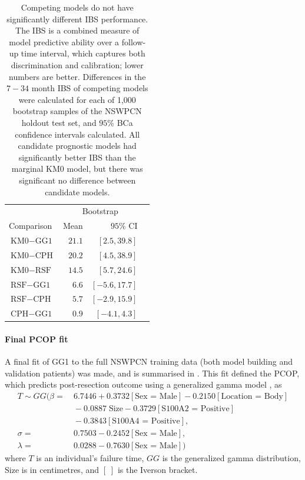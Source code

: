 \documentclass[dissertation.tex]{subfiles}
\begin{document}
\begin{table}
\centering
\caption[Prognostic model \acrshort{IBS} comparison]{Competing models do not have significantly different \gls{IBS} performance.  The \gls{IBS} is a combined measure of model predictive ability over a follow-up time interval, which captures both discrimination and calibration; lower numbers are better.  Differences in the $7-34$ month \gls{IBS} of competing models were calculated for each of 1,000 bootstrap samples of the \gls{NSWPCN} holdout test set, and $95\%$ BCa confidence intervals \cite{Efron1987} calculated.  All candidate prognostic models had significantly better \gls{IBS} than the marginal KM0 model, but there was significant no difference between candidate models.}
\label{tab:nomo-ibs-boot}
\begin{tabular}{lrrr}
\toprule
                             & \multicolumn{2}{c}{Bootstrap}   \\ \cmidrule(r){2-3}
Comparison                   & Mean          & $95\%$ CI       \\ \midrule
$\mbox{KM0} - \mbox{GG1}$    & $21.1$        & $[2.5, 39.8]$   \\
$\mbox{KM0} - \mbox{CPH}$    & $20.2$        & $[4.5, 38.9]$   \\
$\mbox{KM0} - \mbox{RSF}$    & $14.5$        & $[5.7, 24.6]$   \\
$\mbox{RSF} - \mbox{GG1}$    &  $6.6$        & $[-5.6, 17.7]$  \\
$\mbox{RSF} - \mbox{CPH}$    &  $5.7$        & $[-2.9, 15.9]$  \\ 
$\mbox{CPH} - \mbox{GG1}$    &  $0.9$        & $[-4.1, 4.3]$   \\ \bottomrule
\end{tabular}
\end{table}

\paragraph{Final \acrshort{PCOP} fit}
A final fit of GG1 to the full \gls{NSWPCN} training data (both model building and validation patients) was made, and is summarised in .  This fit defined the \gls{PCOP}, which predicts post-resection outcome using a generalized gamma model \cite{Cox2007}, as
\begin{align*}
T \sim GG(\beta   = &\ 6.7446 + 0.3732[\mbox{Sex = Male}] - 0.2150[\mbox{Location = Body}] \\
                    &\ -0.0887\;\mbox{Size} - 0.3729[\mbox{S100A2 = Positive}] \\
                    &\ -0.3843[\mbox{S100A4 = Positive}], \\ 
          \sigma  = &\ 0.7503 - 0.2452[\mbox{Sex = Male}],\\
          \lambda = &\ 0.0288 - 0.7630[\mbox{Sex = Male}])
\end{align*}
where $T$ is an individual's failure time, $GG$ is the generalized gamma distribution, $\mbox{Size}$ is in centimetres, and $[\;]$ is the Iverson bracket.
\end{document}
